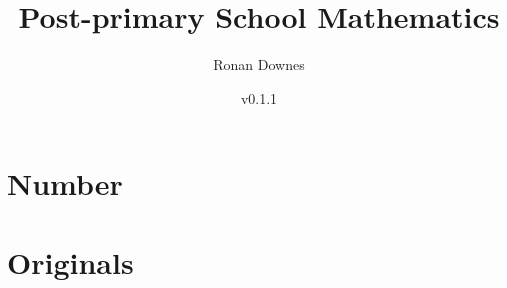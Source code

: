 \documentclass[a4paper,10pt,parskip=half]{scrbook}
\title{Post-primary School Mathematics}
\author{Ronan Downes}
\date{v0.1.1}
\begin{document}
\frontmatter
\maketitle
\clearpage
% 
% 
\dominitoc
\setcounter{tocdepth}{0}
\tableofcontents

\mainmatter
\large


\part{Number}

\part{Originals}






 


\backmatter 
 


\cleardoublepage
\thispagestyle{empty}
\printindex
\end{document}
